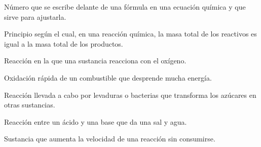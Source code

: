 \begin{vocabulary}
    Número que se escribe delante de una fórmula en una ecuación química y que sirve para ajustarla.
\end{vocabulary}

\begin{vocabulary}
    Principio según el cual, en una reacción química, la masa total de los reactivos es igual a la masa total de los productos.
\end{vocabulary}

\begin{vocabulary}
    Reacción en la que una sustancia reacciona con el oxígeno.
\end{vocabulary}

\begin{vocabulary}
    Oxidación rápida de un combustible que desprende mucha energía.
\end{vocabulary}

\begin{vocabulary}
    Reacción llevada a cabo por levaduras o bacterias que transforma los azúcares en otras sustancias.
\end{vocabulary}

\begin{vocabulary}
    Reacción entre un ácido y una base que da una sal y agua.
\end{vocabulary}

\begin{vocabulary}
    Sustancia que aumenta la velocidad de una reacción sin consumirse.
\end{vocabulary}
